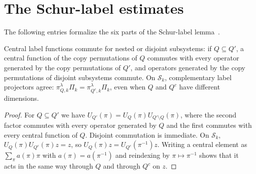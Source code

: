 \section{The Schur-label estimates}

The following entries formalize the six parts of the Schur-label
lemma~\cite[Lemma 6.1]{OpenAI2026AreaLaw}.

\begin{theorem}
    \label{thm:schur_label_commutation}
    \leanok
    Central label functions commute for nested or disjoint subsystems: if
    $Q\subseteq Q'$, a central function of the copy permutations of $Q$
    commutes with every operator generated by the copy permutations of $Q'$,
    and operators generated by the copy permutations of disjoint subsystems
    commute. On $\mathcal S_k$, complementary label projectors agree:
    $\pi^\lambda_{Q,k}\Pi_k=\pi^\lambda_{Q^c,k}\Pi_k$, even when $Q$ and $Q^c$
    have different dimensions.
\end{theorem}

\begin{proof}\leanok
    For $Q\subseteq Q'$ we have $U_{Q'}(\pi)=U_Q(\pi)U_{Q'\setminus Q}(\pi)$,
    where the second factor commutes with every operator generated by $Q$ and
    the first commutes with every central function of $Q$. Disjoint
    commutation is immediate. On $\mathcal S_k$,
    $U_Q(\pi)U_{Q^c}(\pi)z=z$, so $U_Q(\pi)z=U_{Q^c}(\pi^{-1})z$. Writing a
    central element as $\sum_\pi a(\pi)\pi$ with $a(\pi)=a(\pi^{-1})$ and
    reindexing by $\pi\mapsto\pi^{-1}$ shows that it acts in the same way
    through $Q$ and through $Q^c$ on $z$.
\end{proof}


